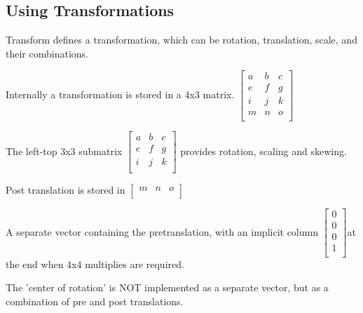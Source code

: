     \subsection{Using Transformations} 
    Transform defines a transformation, which can be rotation,
    translation, scale, and their combinations.
    
    Internally a transformation is stored in a 4x3 matrix.
    \( \left[ \begin{array}{ccc}
        a&b&c\\
        e&f&g\\
        i&j&k\\
         m&n&o\\
      \end{array} \right] \)
    
    The left-top 3x3 submatrix
    \(\left[ \begin{array}{ccc}
        a& b& c\\
         e& f& g\\
         i& j& k\\
      \end{array} \right] \) 
    provides rotation, scaling and skewing.
    
    Post translation is stored in 
      \( \left[ \begin{array}{ccc}
	  m&n&o\\
	\end{array} \right] \)
      
      A separate vector containing the pretranslation, with an implicit
      column   \( \left[ \begin{array}{c}
	  0\\0\\0\\1\\
	\end{array} \right] \)at the end when 4x4 multiplies are required.
      
      The 'center of rotation' is NOT implemented as a separate vector,
      but as a combination of pre and post translations.
      
      
